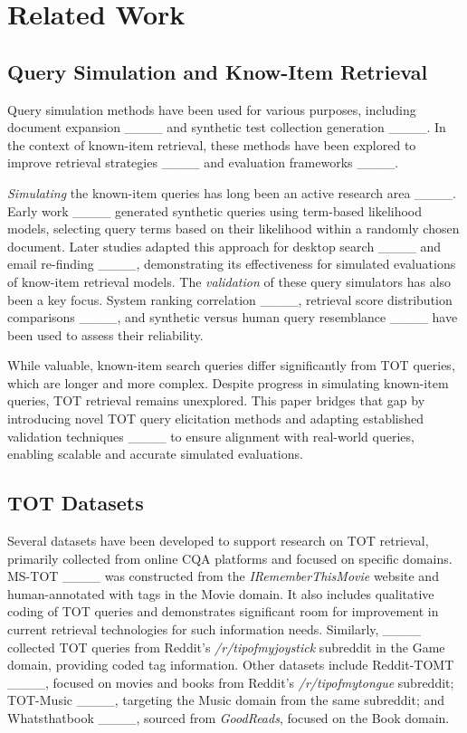 \section{Related Work}
\subsection{Query Simulation and Know-Item Retrieval}

Query simulation methods have been used for various purposes, including document expansion ____ and synthetic test collection generation ____. In the context of known-item retrieval, these methods have been explored to improve retrieval strategies ____ and evaluation frameworks ____.



\textit{Simulating} the known-item queries has long been an active research area ____.
Early work ____ generated synthetic queries using term-based likelihood models, selecting query terms based on their likelihood within a randomly chosen document. Later studies adapted this approach for desktop search ____ and email re-finding ____, demonstrating its effectiveness for simulated evaluations of know-item retrieval models.
%
The \textit{validation} of these query simulators has also been a key focus.
System ranking correlation ____, retrieval score distribution comparisons ____, and synthetic versus human query resemblance ____ have been used to assess their reliability.


While valuable, known-item search queries differ significantly from TOT queries, which are longer and more complex. Despite progress in simulating known-item queries, TOT retrieval remains unexplored. This paper bridges that gap by introducing novel TOT query elicitation methods and adapting established validation techniques ____ to ensure alignment with real-world queries, enabling scalable and accurate simulated evaluations.






\subsection{TOT Datasets}
Several datasets have been developed to support research on TOT retrieval, primarily collected from online CQA platforms and focused on specific domains. MS-TOT ____ was constructed from the \textit{IRememberThisMovie} website and human-annotated with tags in the Movie domain. It also includes qualitative coding of TOT queries and demonstrates significant room for improvement in current retrieval technologies for such information needs. Similarly, ____ collected TOT queries from Reddit's \textit{/r/tipofmyjoystick} subreddit in the Game domain, providing coded tag information. Other datasets include Reddit-TOMT ____, focused on movies and books from Reddit's \textit{/r/tipofmytongue} subreddit; TOT-Music ____, targeting the Music domain from the same subreddit; and Whatsthatbook ____, sourced from \textit{GoodReads}, focused on the Book domain.



